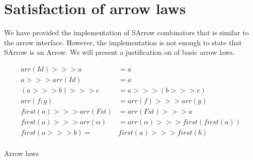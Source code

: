 \section{Satisfaction of arrow laws}
We have provided the implementation of SArrow combinators that is similar to the arrow interface. However, the implementation is not enough to state that SArrow is an Arrow. We will present a justification on of basic arrow laws.
\begin{table}[ht]
    \begin{align*}
        arr(Id) >>> a &= a \tag{1}\\
        a >>> arr(Id) &= a \tag{2}\\
        (a >>> b) >>> c &= a >>> (b >>> c) \tag{3}\\
        arr(f;g) &= arr(f) >>> arr(g) \tag{4}\\
        first(a) >>> arr(Fst) &= arr(Fst) >>> a \tag{5}\\
        first(a) >>> arr(\alpha) &= arr(\alpha) >>> first(first(a)) \tag{6}\\
        first(a >>> b) =& first(a) >>> first(b) \tag{7}\\
    \end{align*}
    \caption{Arrow laws \cite{atkeyWhatCategoricalModel2011}}
    \label{arrow:tab:law}
\end{table}

